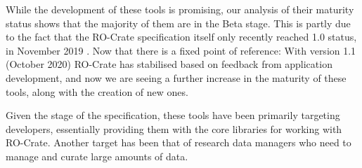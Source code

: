 While the development of these tools is promising, our analysis of their
maturity status shows that the majority of them are in the Beta stage.
This is partly due to the fact that the RO-Crate specification itself
only recently reached 1.0 status, in November 2019
\cite{ch5-105}. Now that there
is a fixed point of reference: With version 1.1 (October 2020)
\cite{ch5-107} RO-Crate has
stabilised based on feedback from application development, and now we
are seeing a further increase in the maturity of these tools, along with
the creation of new ones.

Given the stage of the specification, these tools have been primarily
targeting developers, essentially providing them with the core libraries
for working with RO-Crate. Another target has been that of research data
managers who need to manage and curate large amounts of data.

